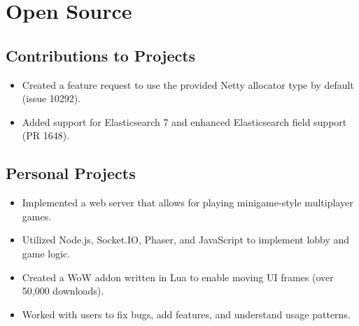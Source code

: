 \documentclass[letterpaper]{resume}
\begin{document}
\begin{minipage}[t]{0.77\columnwidth}
\sectionspace


\section{Open Source}

\subsection{Contributions to Projects}
\vspace{2pt}
\begin{itemize}
\item Created a feature request to use the provided Netty allocator type by default (issue 10292).
\end{itemize}
\vspace{3pt}
\vspace{2pt}
\begin{itemize}
\item Added support for Elasticsearch 7 and enhanced Elasticsearch field support (PR 1648).
\end{itemize}

\sectionspace

\subsection{Personal Projects}
\vspace{2pt}
\begin{itemize}
\item Implemented a web server that allows for playing minigame-style multiplayer games.
\item Utilized Node.js, Socket.IO, Phaser, and JavaScript to implement lobby and game logic.
\end{itemize}
\vspace{3pt}
\vspace{2pt}
\begin{itemize}
\item Created a WoW addon written in Lua to enable moving UI frames (over 50,000 downloads).
\item Worked with users to fix bugs, add features, and understand usage patterns.
\end{itemize}

\sectionspace

\end{minipage}
\end{document}
